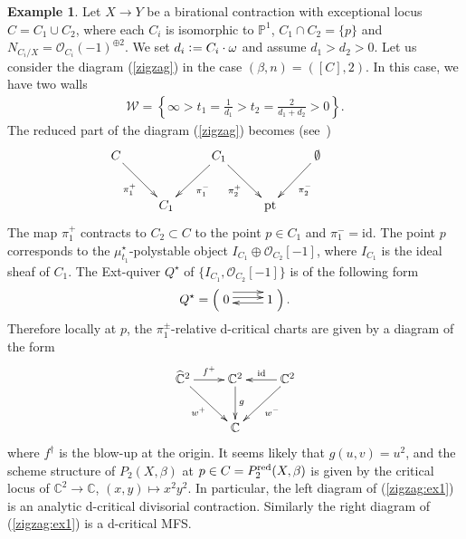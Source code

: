 \documentclass[11pt]{amsart}
\theoremstyle{plain}
\theoremstyle{definition}
\newtheorem{exam}[thm]{Example}
\theoremstyle{remark}
\newcommand{\oO}{\mathcal{O}}
\newcommand{\wW}{\mathcal{W}}
\newcommand{\id}{\textrm{id}}
\begin{document}
\begin{exam}\label{exam:non-irre1}
Let $X \to Y$ be a birational contraction 
with exceptional locus $C=C_1 \cup C_2$, 
where each $C_i$ is isomorphic to $\mathbb{P}^1$, 
$C_1 \cap C_2=\{p\}$
and $N_{C_i/X}=\oO_{C_i}(-1)^{\oplus 2}$. 
We set $d_i \cneq C_i \cdot \omega$ and 
assume $d_1>d_2>0$. 
Let us consider the diagram (\ref{zigzag})
in the case $(\beta, n)=([C], 2)$. In this case, 
we have two walls 
\begin{align*}
\wW=\left\{
\infty>t_1=\frac{1}{d_1} >t_2=\frac{2}{d_1+d_2} >0
\right\}. 
\end{align*}
The reduced part of the diagram (\ref{zigzag})
becomes (see~\cite[Section~5.2]{Tolim})
\begin{align}\label{zigzag:ex1}
\xymatrix{
C \ar[rd]_-{\pi_1^+}  &  &  C_1 \ar[ld]^-{\pi_1^-} \ar[rd]_-{\pi_2^+} &  & 
\emptyset \ar[ld]^-{\pi_2^-}  &  
\\
& C_1  & & \mathrm{pt} & & 
}
\end{align} 
The map $\pi_1^+$ contracts 
to $C_2 \subset C$ to the point 
$p \in C_1$
and $\pi_1^-=\id$. 
The point $p$ corresponds to 
the $\mu_{t_1}^{\star}$-polystable 
object $I_{C_1} \oplus \oO_{C_2}[-1]$, 
where $I_{C_1}$ is the ideal sheaf of $C_1$. 
The Ext-quiver $Q^{\star}$ 
of $\{I_{C_1}, \oO_{C_2}[-1]\}$
is of the following form
\begin{align*}
Q^{\star}=\left(\xymatrix{
0 \ar@<0.5ex>[r] \ar@<1.5ex>[r]& 1 \ar@<0.5ex>[l]
}\right). 
\end{align*}
Therefore locally at $p$, the 
$\pi_1^{\pm}$-relative d-critical charts 
are given by a diagram of the form
\begin{align*}
\xymatrix{
\widehat{\mathbb{C}}^2 \ar[r]^-{f^{+}} \ar[rd]_-{w^+} 
& \mathbb{C}^2 \ar[d]^-{g} &
\ar[l]_-{\id} \mathbb{C}^2 \ar[ld]^-{w^-}\\
& \mathbb{C} &
}
\end{align*}
where $f^{\dag}$ is the blow-up 
at the origin. 
It seems likely that 
$g(u, v)=u^2$, and the scheme structure 
of $P_2(X, \beta)$ at $p \in C=P_2^{\rm{red}}(X, \beta)$
is given by the critical locus of 
$\mathbb{C}^2 \to \mathbb{C}$, 
$(x, y) \mapsto x^2 y^2$. 
In particular, the left diagram of (\ref{zigzag:ex1})
is an analytic d-critical divisorial contraction. 
Similarly the right diagram of (\ref{zigzag:ex1})
is a d-critical MFS. 
\end{exam}
\end{document}
